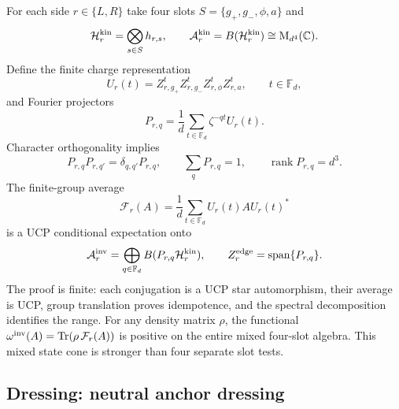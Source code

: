 \documentclass[11pt,a4paper]{article}
\theoremstyle{definition}
\theoremstyle{remark}
\newcommand{\C}{\mathbb C}
\newcommand{\Fd}{\mathbb F_d}
\newcommand{\A}{\mathcal A}
\newcommand{\Hh}{\mathcal H}
\newcommand{\M}{\mathrm M}
\newcommand{\Tr}{\operatorname{Tr}}
\newcommand{\Span}{\operatorname{span}}
\newcommand{\rank}{\operatorname{rank}}
\begin{document}
For each side $r\in\{L,R\}$ take four slots
$S=\{g_+,g_-,\phi,a\}$ and
\begin{equation}
 \Hh_r^{\rm kin}=\bigotimes_{s\in S}h_{r,s},\qquad
 \A_r^{\rm kin}=B(\Hh_r^{\rm kin})\cong\M_{d^4}(\C).
\end{equation}
Define the finite charge representation
\begin{equation}
 U_r(t)=Z_{r,g_+}^tZ_{r,g_-}^tZ_{r,\phi}^tZ_{r,a}^t,\qquad t\in\Fd,
\end{equation}
and Fourier projectors
\begin{equation}
 P_{r,q}=\frac1d\sum_{t\in\Fd}\zeta^{-qt}U_r(t).
 \label{eq:charge-projectors}
\end{equation}
Character orthogonality implies
\begin{equation}
 P_{r,q}P_{r,q'}=\delta_{q,q'}P_{r,q},\qquad
 \sum_qP_{r,q}=1,\qquad \rank P_{r,q}=d^3.
 \label{eq:projector-laws}
\end{equation}
The finite-group average
\begin{equation}
 \mathcal F_r(A)=\frac1d\sum_{t\in\Fd}U_r(t)AU_r(t)^*
 \label{eq:group-average}
\end{equation}
is a UCP conditional expectation onto
\begin{equation}
 \A_r^{\rm inv}=\bigoplus_{q\in\Fd}B(P_{r,q}\Hh_r^{\rm kin}),
 \qquad
 Z_r^{\rm edge}=\Span\{P_{r,q}\}.
 \label{eq:invariant-algebra}
\end{equation}
The proof is finite: each conjugation is a UCP star automorphism, their average is UCP,
group translation proves idempotence, and the spectral decomposition identifies the
range.  For any density matrix $\rho$, the functional
$\omega^{\rm inv}(A)=\Tr(\rho\,\mathcal F_r(A))$ is positive on the entire mixed
four-slot algebra.  This mixed state cone is stronger than four separate slot tests.

\subsection{Dressing: neutral anchor dressing}
\end{document}
